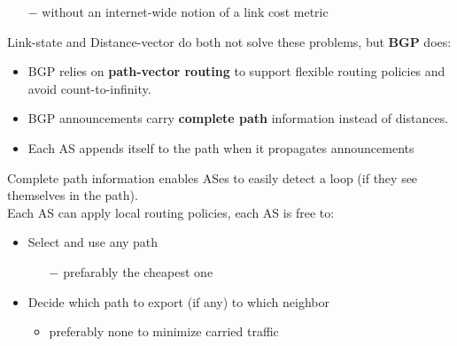\documentclass[a4paper, fontsize=8pt, landscape, DIV=1]{scrartcl}
\begin{document}
\begin{multicols*}{4}
\begin{itemize}[noitemsep]
\begin{itemize}
 				\item[$-$] without an internet-wide notion of a link cost metric
 			\end{itemize}		
		 \end{itemize}
	 	Link-state and Distance-vector do both not solve these problems, but \textbf{BGP} does:
	 	\begin{itemize}[noitemsep]
	 		\item BGP relies on \textbf{path-vector routing} to support flexible routing policies and avoid count-to-infinity.
	 		\item BGP announcements carry \textbf{complete path} information instead of distances.
	 		\item Each AS appends itself to the path when it propagates announcements
	 	\end{itemize}
	 	Complete path information enables ASes to easily detect a loop (if they see themselves in the path).\\
	 	Each AS can apply local routing policies, each AS is free to: 
	 	\begin{itemize}[noitemsep]
	 		\item Select and use any path
	 		\begin{itemize}
	 			\item[$-$]prefarably the cheapest one
	 		\end{itemize}
 			\item Decide which path to export (if any) to which neighbor 
 			\begin{itemize}
 				\item preferably none to minimize carried traffic
 			\end{itemize}
	 	\end{itemize}
	 	
	 	
		 
		  
		\end{multicols*}
	\setcounter{secnumdepth}{3}
\end{document}
